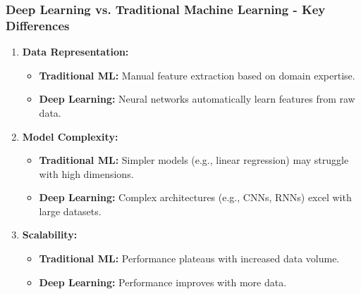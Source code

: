 \documentclass[aspectratio=169]{beamer}
\begin{document}
\begin{frame}[fragile]
    \frametitle{Deep Learning vs. Traditional Machine Learning - Key Differences}
    \begin{enumerate}
        \item \textbf{Data Representation:}
            \begin{itemize}
                \item \textbf{Traditional ML:} Manual feature extraction based on domain expertise.
                \item \textbf{Deep Learning:} Neural networks automatically learn features from raw data.
            \end{itemize}
            
        \item \textbf{Model Complexity:}
            \begin{itemize}
                \item \textbf{Traditional ML:} Simpler models (e.g., linear regression) may struggle with high dimensions.
                \item \textbf{Deep Learning:} Complex architectures (e.g., CNNs, RNNs) excel with large datasets.
            \end{itemize}
            
        \item \textbf{Scalability:}
            \begin{itemize}
                \item \textbf{Traditional ML:} Performance plateaus with increased data volume.
                \item \textbf{Deep Learning:} Performance improves with more data.
            \end{itemize}
    \end{enumerate}
\end{frame}
\end{document}
